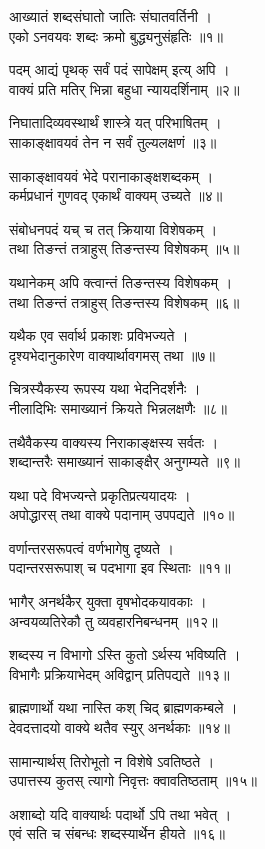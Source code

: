 आख्यातं शब्दसंघातो जातिः संघातवर्तिनी ।\\एको ऽनवयवः शब्दः क्रमो बुद्ध्यनुसंहृतिः ॥१॥

पदम् आद्यं पृथक् सर्वं पदं सापेक्षम् इत्य् अपि ।\\वाक्यं प्रति मतिर् भिन्ना बहुधा न्यायदर्शिनाम् ॥२॥

निघातादिव्यवस्थार्थं शास्त्रे यत् परिभाषितम् ।\\साकाङ्क्षावयवं तेन न सर्वं तुल्यलक्षणं ॥३॥

साकाङ्क्षावयवं भेदे परानाकाङ्क्षशब्दकम् ।\\कर्मप्रधानं गुणवद् एकार्थं वाक्यम् उच्यते ॥४॥

संबोधनपदं यच् च तत् क्रियाया विशेषकम् ।\\तथा तिङन्तं तत्राहुस् तिङन्तस्य विशेषकम् ॥५॥

यथानेकम् अपि क्त्वान्तं तिङन्तस्य विशेषकम् ।\\तथा तिङन्तं तत्राहुस् तिङन्तस्य विशेषकम् ॥६॥

यथैक एव सर्वार्थ प्रकाशः प्रविभज्यते ।\\दृश्यभेदानुकारेण वाक्यार्थावगमस् तथा ॥७॥

चित्रस्यैकस्य रूपस्य यथा भेदनिदर्शनैः ।\\नीलादिभिः समाख्यानं क्रियते भिन्नलक्षणैः ॥८॥

तथैवैकस्य वाक्यस्य निराकाङ्क्षस्य सर्वतः ।\\शब्दान्तरैः समाख्यानं साकाङ्क्षैर् अनुगम्यते ॥९॥

यथा पदे विभज्यन्ते प्रकृतिप्रत्ययादयः ।\\अपोद्धारस् तथा वाक्ये पदानाम् उपपद्यते ॥१०॥

वर्णान्तरसरूपत्वं वर्णभागेषु दृष्यते ।\\पदान्तरसरूपाश् च पदभागा इव स्थिताः ॥११॥

भागैर् अनर्थकैर् युक्ता वृषभोदकयावकाः ।\\अन्वयव्यतिरेकौ तु व्यवहारनिबन्धनम् ॥१२॥

शब्दस्य न विभागो ऽस्ति कुतो ऽर्थस्य भविष्यति ।\\विभागैः प्रक्रियाभेदम् अविद्वान् प्रतिपद्यते ॥१३॥

ब्राह्मणार्थो यथा नास्ति कश् चिद् ब्राह्मणकम्बले ।\\देवदत्तादयो वाक्ये थतैव स्युर् अनर्थकाः ॥१४॥

सामान्यार्थस् तिरोभूतो न विशेषे ऽवतिष्ठते ।\\उपात्तस्य कुतस् त्यागो निवृत्तः क्वावतिष्ठताम् ॥१५॥

अशाब्दो यदि वाक्यार्थः पदार्थो ऽपि तथा भवेत् ।\\एवं सति च संबन्धः शब्दस्यार्थेन हीयते ॥१६॥

